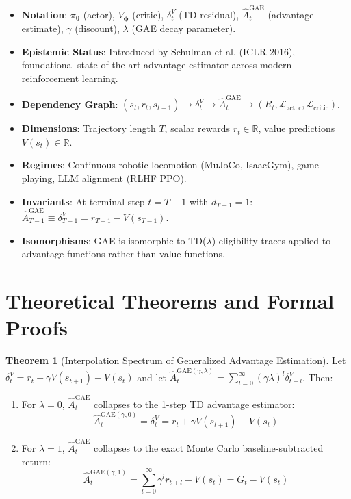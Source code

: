 \documentclass[11pt,a4paper]{article}
\theoremstyle{definition}
\newtheorem{theorem}{\textbf{Theorem}}[section]
\begin{document}
\begin{itemize}
    \item \textbf{Notation}: $\pi_{\boldsymbol{\theta}}$ (actor), $V_{\boldsymbol{\phi}}$ (critic), $\delta_t^V$ (TD residual), $\widehat{A}_t^{\text{GAE}}$ (advantage estimate), $\gamma$ (discount), $\lambda$ (GAE decay parameter).
    \item \textbf{Epistemic Status}: Introduced by Schulman et al. (ICLR 2016), foundational state-of-the-art advantage estimator across modern reinforcement learning.
    \item \textbf{Dependency Graph}: $(s_t, r_t, s_{t+1}) \to \delta_t^V \to \widehat{A}_t^{\text{GAE}} \to (R_t, \mathcal{L}_{\text{actor}}, \mathcal{L}_{\text{critic}})$.
    \item \textbf{Dimensions}: Trajectory length $T$, scalar rewards $r_t \in \mathbb{R}$, value predictions $V(s_t) \in \mathbb{R}$.
    \item \textbf{Regimes}: Continuous robotic locomotion (MuJoCo, IsaacGym), game playing, LLM alignment (RLHF PPO).
    \item \textbf{Invariants}: At terminal step $t=T-1$ with $d_{T-1} = 1$: $\widehat{A}_{T-1}^{\text{GAE}} \equiv \delta_{T-1}^V = r_{T-1} - V(s_{T-1})$.
    \item \textbf{Isomorphisms}: GAE is isomorphic to TD($\lambda$) eligibility traces applied to advantage functions rather than value functions.
\end{itemize}

\section{Theoretical Theorems and Formal Proofs}

\begin{theorem}[Interpolation Spectrum of Generalized Advantage Estimation]
Let $\delta_t^V = r_t + \gamma V(s_{t+1}) - V(s_t)$ and let $\widehat{A}_t^{\text{GAE}(\gamma, \lambda)} = \sum_{l=0}^\infty (\gamma \lambda)^l \delta_{t+l}^V$. Then:
\begin{enumerate}
    \item For $\lambda = 0$, $\widehat{A}_t^{\text{GAE}}$ collapses to the 1-step TD advantage estimator:
    {\boldmath
    \begin{equation}
    \widehat{A}_t^{\text{GAE}(\gamma, 0)} = \delta_t^V = r_t + \gamma V(s_{t+1}) - V(s_t)
    \end{equation}
    }
    \item For $\lambda = 1$, $\widehat{A}_t^{\text{GAE}}$ collapses to the exact Monte Carlo baseline-subtracted return:
    {\boldmath
    \begin{equation}
    \widehat{A}_t^{\text{GAE}(\gamma, 1)} = \sum_{l=0}^\infty \gamma^l r_{t+l} - V(s_t) = G_t - V(s_t)
    \end{equation}
    }
\end{enumerate}
\end{theorem}
\end{document}
